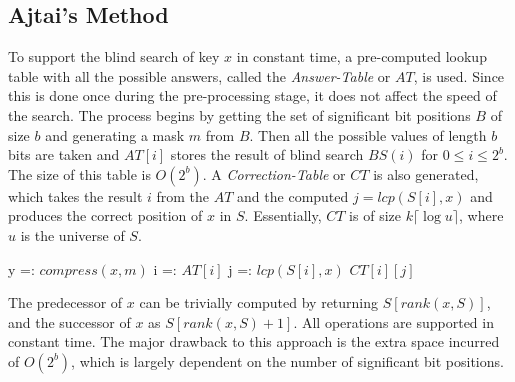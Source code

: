 \subsection{Ajtai's Method}
To support the blind search of key $x$ in constant time, a pre-computed lookup table with all the possible answers, called the \textit{Answer-Table} or $AT$, is used. Since this is done once during the pre-processing stage, it does not affect the speed of the search. The process begins by getting the set of significant bit positions $B$ of size $b$ and generating a mask $m$ from $B$. Then all the possible values of length $b$ bits are taken and $AT[i]$ stores the result of blind search $BS(i)$ for $0 \leq i \leq 2^b$. The size of this table is $O(2^b)$. A \textit{Correction-Table} or $CT$ is also generated, which takes the result $i$ from the $AT$ and the computed $j = lcp(S[i], x)$ and produces the correct position of $x$ in $S$. Essentially, $CT$ is of size $k \lceil \log u \rceil$, where $u$ is the universe of $S$.
\begin{table}[ht]
    \centering
    \begin{minipage}[t]{1\textwidth}
        \centering
        \begin{algorithm}[H]
            \caption{rank(S, x)}
            \begin{algorithmic}[1]
                \STATE y =: $compress(x, m)$
                \STATE i =: $AT[i]$
                \STATE j =: $lcp(S[i], x)$
                \RETURN $CT[i][j]$
            \end{algorithmic}
        \end{algorithm}
    \end{minipage}%
\end{table}
The predecessor of $x$ can be trivially computed by returning $S[rank(x, S)]$, and the successor of $x$ as $S[rank(x, S) + 1]$. All operations are supported in constant time. The major drawback to this approach is the extra space incurred of $O(2^b)$, which is largely dependent on the number of significant bit positions.
\par
